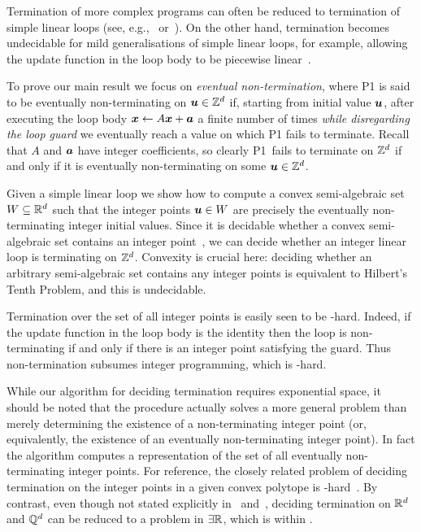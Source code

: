 Termination of more complex programs can often be reduced to
termination of simple linear loops (see, e.g.,~\cite{CookPR06}
or~\cite[Section 6]{Tiw04}).  On the other hand, termination becomes
undecidable for mild generalisations of simple linear loops, for
example, allowing the update function in the loop body to be piecewise
linear~\cite{BGM12}.

To prove our main result we focus on \emph{eventual non-termination},
where \textsf{P1} is said to be eventually non-terminating on
$\boldsymbol{u} \in \mathbb{Z}^{d}$ if, starting from initial value
$\boldsymbol{u}$, after executing the loop body $\boldsymbol{x} \gets
A\boldsymbol{x}+\boldsymbol{a}$ a finite number of times \emph{while
  disregarding the loop guard} we eventually reach a value on which
\textsf{P1} fails to terminate.  Recall that $A$ and $\boldsymbol{a}$
have integer coefficients, so clearly \textsf{P1}~fails to
terminate on $\mathbb{Z}^{d}$ if and only if it is eventually
non-terminating on some $\boldsymbol{u} \in \mathbb{Z}^{d}$.

Given a simple linear loop we show how to compute a convex
semi-algebraic set $W \subseteq \mathbb{R}^{d}$ such that the integer
points $\boldsymbol{u} \in W$ are precisely the eventually
non-terminating integer initial values.  Since it is decidable whether
a convex semi-algebraic set contains an integer
point~\cite{KhachiyanP97}, we can
decide whether an integer linear loop is terminating on
$\mathbb{Z}^{d}$. Convexity is crucial here: deciding whether an arbitrary
semi-algebraic set contains any integer points is equivalent to
Hilbert's Tenth Problem, and this is undecidable.

Termination over the set of all integer points is easily seen to be
\coNP-hard.  Indeed, if the update function in the loop body
is the identity then the loop is non-terminating if and only if there
is an integer point satisfying the guard.  Thus non-termination
subsumes integer programming, which is \NP-hard.

While our algorithm for deciding termination requires exponential
space, it should be noted that the procedure actually solves a more
general problem than merely determining the existence of a
non-terminating integer point (or, equivalently, the existence of an
eventually non-terminating integer point).  In fact the algorithm
computes a representation of the set of all eventually non-terminating
integer points.  For reference, the closely related problem of
deciding termination on the integer points in a given convex polytope is
\EXPSPACE-hard~\cite{BGM12}. By contrast, even though not stated explicitly in~\cite{Tiw04} and~\cite{Bra06}, deciding termination on $\mathbb{R}^{d}$ and $\mathbb{Q}^{d}$ can be reduced to a problem in $\exists \mathbb{R}$, which is within \PSPACE.

